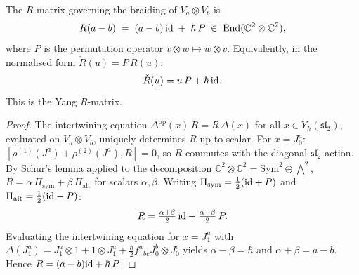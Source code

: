 \begin{theorem}
\label{thm:sl2-R-matrix}
The $R$-matrix governing the braiding of
$V_a\otimes V_b$ is
\begin{equation}\label{eq:sl2-R-eval}
R(a-b)
\;=\;
(a-b)\,\mathrm{id}\;+\;\hbar\,P
\;\in\;
\operatorname{End}(\mathbb{C}^2\otimes\mathbb{C}^2),
\end{equation}
where $P$ is the permutation operator $v\otimes w\mapsto w\otimes v$.
Equivalently, in the normalised form $\check{R}(u)=P\,R(u)$:
\[
\check{R}(u)
=
u\,P+\hbar\,\mathrm{id}.
\]
This is the Yang $R$-matrix.
\end{theorem}

\begin{proof}
The intertwining equation
$\Delta^{\mathrm{op}}(x)\,R=R\,\Delta(x)$ for all
$x\in Y_\hbar(\mathfrak{sl}_2)$, evaluated on
$V_a\otimes V_b$, uniquely determines $R$ up to scalar.
For $x=J^a_0$:
$[\rho^{(1)}(J^a)+\rho^{(2)}(J^a),R]=0$, so $R$
commutes with the diagonal $\mathfrak{sl}_2$-action. By
Schur's lemma applied to the decomposition
$\mathbb{C}^2\otimes\mathbb{C}^2=\mathrm{Sym}^2\oplus\bigwedge^2$,
$R=\alpha\,\Pi_{\mathrm{sym}}+\beta\,\Pi_{\mathrm{alt}}$
for scalars $\alpha,\beta$. Writing
$\Pi_{\mathrm{sym}}=\tfrac{1}{2}(\mathrm{id}+P)$ and
$\Pi_{\mathrm{alt}}=\tfrac{1}{2}(\mathrm{id}-P)$:
\[
R=\tfrac{\alpha+\beta}{2}\,\mathrm{id}
+\tfrac{\alpha-\beta}{2}\,P.
\]
Evaluating the intertwining equation for
$x=J^a_1$ with $\Delta(J^a_1)=J^a_1\otimes 1+1\otimes J^a_1
+\tfrac{\hbar}{2}f^a{}_{bc}J^b_0\otimes J^c_0$
yields $\alpha-\beta=\hbar$ and $\alpha+\beta=a-b$.
Hence $R=(a-b)\mathrm{id}+\hbar\,P$.
\end{proof}

